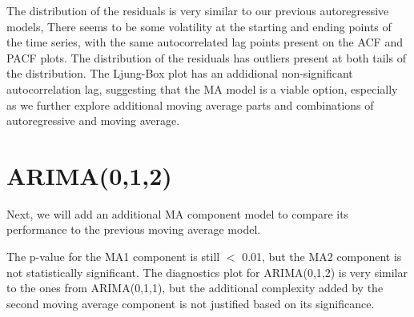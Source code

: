 \documentclass[12pt]{article}
\begin{document}
The distribution of the residuals is very similar to our previous autoregressive models, There seems to be some volatility at the starting and ending points of the time series, with the same autocorrelated lag points present on the ACF and PACF plots. The distribution of the residuals has outliers present at both tails of the distribution. The Ljung-Box plot has an addidional non-significant autocorrelation lag, suggesting that the MA model is a viable option, especially as we further explore additional moving average parts and combinations of autoregressive and moving average.
\newpage
\section{ARIMA(0,1,2)}
Next, we will add an additional MA component model to compare its performance to the previous moving average model.




The p-value for the MA1 component is still $<$ 0.01, but the MA2 component is not statistically significant. The diagnostics plot for ARIMA(0,1,2) is very similar to the ones from ARIMA(0,1,1), but the additional complexity added by the second moving average component is not justified based on its significance.
\end{document}
